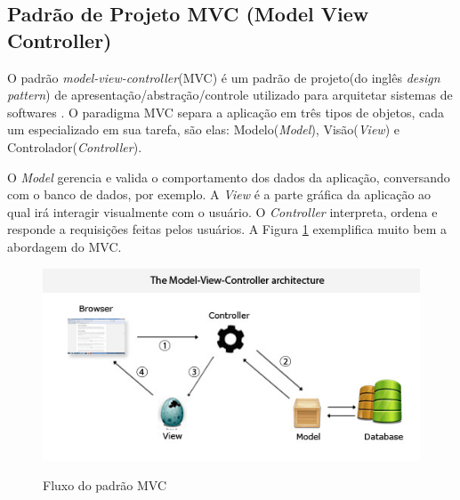 \subsection{Padrão de Projeto MVC (Model View Controller)}
\label{subsec:thresholding}

O padrão \textit{model-view-controller}(MVC) é um padrão de projeto(do inglês \textit{design pattern}) de apresentação/abstração/controle utilizado para arquitetar sistemas de softwares \cite{leff2001webmvc}. O paradigma MVC separa a aplicação em três tipos de objetos, cada um especializado em sua tarefa, são elas: Modelo(\textit{Model}), Visão(\textit{View}) e Controlador(\textit{Controller}). \par
O \textit{Model} gerencia e valida o comportamento dos dados da aplicação, conversando com o banco de dados, por exemplo. A \textit{View} é a parte gráfica da aplicação ao qual irá interagir visualmente com o usuário. O \textit{Controller} interpreta, ordena e responde a requisições feitas pelos usuários\cite{burbeck1997applications}. A Figura \ref{fig:mvc} exemplifica muito bem a abordagem do MVC. \par

\begin{figure}[htbp!]
  \centering
  \caption{Fluxo do padrão MVC}
  \includegraphics[width=1\textwidth]{figs/mvc.jpg}
    \label{fig:mvc}
\end{figure}


